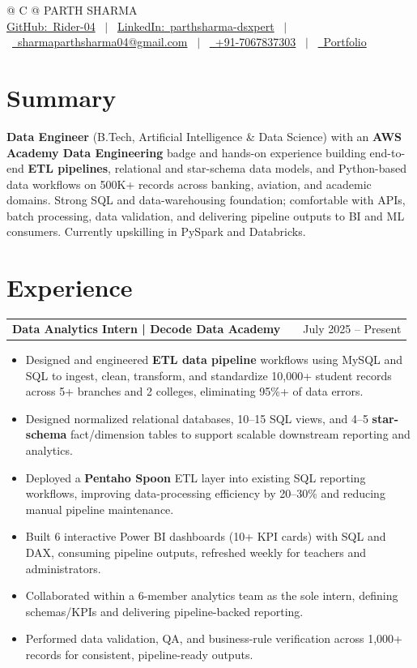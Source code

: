 \documentclass[a4paper,10pt]{article}
\makeatletter
\newcommand{\faGithub}{GitHub:}\newcommand{\faLinkedin}{LinkedIn:}\newcommand{\faEnvelope}{}%
\newcommand{\faMobile}{}\newcommand{\faGlobe}{}}
\newenvironment{joblong}[2]
    {
    \begin{tabularx}{\linewidth}{@{}l X r@{}}
    \textbf{#1} & \hfill &  #2 \\[2pt]
    \end{tabularx}
    \begin{minipage}[t]{\linewidth}
    \begin{itemize}[nosep,after=\strut, leftmargin=1em, itemsep=1pt,label=--]
    }
    {
    \end{itemize}
    \end{minipage}
    }
\makeatother
\begin{document}
\pagestyle{empty}

\begin{tabularx}{\linewidth}{@{} C @{}}
\Huge{PARTH SHARMA} \\[5pt]
\href{https://github.com/Rider-04}{\raisebox{-0.05\height}\faGithub\ Rider-04} \ $|$ \
\href{https://www.linkedin.com/in/parthsharma-dsxpert}{\raisebox{-0.05\height}\faLinkedin\ parthsharma-dsxpert} \ $|$ \
\href{mailto:sharmaparthsharma04@gmail.com}{\raisebox{-0.05\height}\faEnvelope \ sharmaparthsharma04@gmail.com} \ $|$ \
\href{tel:+917067837303}{\raisebox{-0.05\height}\faMobile \ +91-7067837303} \ $|$ \
\href{https://parth-portfolio-virid.vercel.app/}{\raisebox{-0.05\height}\faGlobe \ Portfolio}
\end{tabularx}

\section{Summary}
\textbf{Data Engineer} (B.Tech, Artificial Intelligence \& Data Science) with an \textbf{AWS Academy Data Engineering} badge and hands-on experience building end-to-end \textbf{ETL pipelines}, relational and star-schema data models, and Python-based data workflows on 500K+ records across banking, aviation, and academic domains. Strong SQL and data-warehousing foundation; comfortable with APIs, batch processing, data validation, and delivering pipeline outputs to BI and ML consumers. Currently upskilling in PySpark and Databricks.

\section{Experience}
\begin{joblong}{Data Analytics Intern | Decode Data Academy}{July 2025 -- Present}
\item Designed and engineered \textbf{ETL data pipeline} workflows using MySQL and SQL to ingest, clean, transform, and standardize 10,000+ student records across 5+ branches and 2 colleges, eliminating 95\%+ of data errors.
\item Designed normalized relational databases, 10--15 SQL views, and 4--5 \textbf{star-schema} fact/dimension tables to support scalable downstream reporting and analytics.
\item Deployed a \textbf{Pentaho Spoon} ETL layer into existing SQL reporting workflows, improving data-processing efficiency by 20--30\% and reducing manual pipeline maintenance.
\item Built 6 interactive Power BI dashboards (10+ KPI cards) with SQL and DAX, consuming pipeline outputs, refreshed weekly for teachers and administrators.
\item Collaborated within a 6-member analytics team as the sole intern, defining schemas/KPIs and delivering pipeline-backed reporting.
\item Performed data validation, QA, and business-rule verification across 1,000+ records for consistent, pipeline-ready outputs.
\end{joblong}
\end{document}

